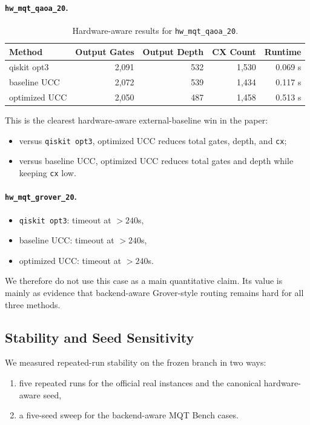 \documentclass[11pt]{article}
\begin{document}
\paragraph{\texttt{hw\_mqt\_qaoa\_20}.}
\begin{table}[h]
\centering
\begin{tabular}{lrrrr}
\toprule
Method & Output Gates & Output Depth & CX Count & Runtime \\
\midrule
qiskit opt3 & 2{,}091 & 532 & 1{,}530 & 0.069 s \\
baseline UCC & 2{,}072 & 539 & 1{,}434 & 0.117 s \\
optimized UCC & 2{,}050 & 487 & 1{,}458 & 0.513 s \\
\bottomrule
\end{tabular}
\caption{Hardware-aware results for \texttt{hw\_mqt\_qaoa\_20}.}
\end{table}

This is the clearest hardware-aware external-baseline win in the paper:
\begin{itemize}[leftmargin=1.5em]
    \item versus \texttt{qiskit opt3}, optimized UCC reduces total gates, depth, and \texttt{cx};
    \item versus baseline UCC, optimized UCC reduces total gates and depth while keeping \texttt{cx} low.
\end{itemize}

\paragraph{\texttt{hw\_mqt\_grover\_20}.}
\begin{itemize}[leftmargin=1.5em]
    \item \texttt{qiskit opt3}: timeout at $>240$s,
    \item baseline UCC: timeout at $>240$s,
    \item optimized UCC: timeout at $>240$s.
\end{itemize}
We therefore do not use this case as a main quantitative claim. Its value is mainly as evidence that backend-aware Grover-style routing remains hard for all three methods.

\subsection{Stability and Seed Sensitivity}

We measured repeated-run stability on the frozen branch in two ways:
\begin{enumerate}[leftmargin=1.5em]
    \item five repeated runs for the official real instances and the canonical hardware-aware seed,
    \item a five-seed sweep for the backend-aware MQT Bench cases.
\end{enumerate}
\end{document}
